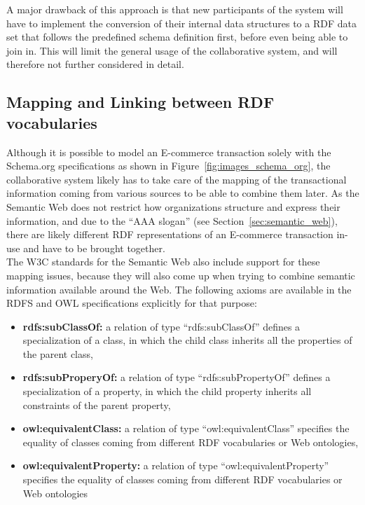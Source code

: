 A major drawback of this approach is that new participants of the system will have to implement the conversion of their internal data structures to a \gls{RDF} data set that follows the predefined schema definition first, before even being able to join in. This will limit the general usage of the collaborative system, and will therefore not further considered in detail.


\subsection{Mapping and Linking between \gls{RDF} vocabularies}

Although it is possible to model an \gls{E-commerce} transaction solely with the Schema.org specifications as shown in Figure~\ref{fig:images_schema_org}, the collaborative system likely has to take care of the mapping of the transactional information coming from various sources to be able to combine them later. As the Semantic Web does not restrict how organizations structure and express their information, and due to the ``AAA slogan'' (see Section~\ref{sec:semantic_web}), there are likely different \gls{RDF} representations of an \gls{E-commerce} transaction in-use and have to be brought together. \\

The \gls{W3C} standards for the Semantic Web also include support for these mapping issues, because they will also come up when trying to combine semantic information available around the Web. The following axioms are available in the \gls{RDFS} and \gls{OWL} specifications explicitly for that purpose: \@

\begin{itemize}
	\item \textbf{rdfs:subClassOf:} a relation of type ``rdfs:subClassOf'' defines a specialization of a class, in which the child class inherits all the properties of the parent class,
  \item \textbf{rdfs:subProperyOf:} a relation of type ``rdfs:subPropertyOf'' defines a specialization of a property, in which the child property inherits all constraints of the parent property,
  \item \textbf{owl:equivalentClass:} a relation of type ``owl:equivalentClass'' specifies the equality of classes coming from different \gls{RDF} vocabularies or Web ontologies,
  \item \textbf{owl:equivalentProperty:} a relation of type ``owl:equivalentProperty'' specifies the equality of classes coming from different \gls{RDF} vocabularies or Web ontologies
\end{itemize}

